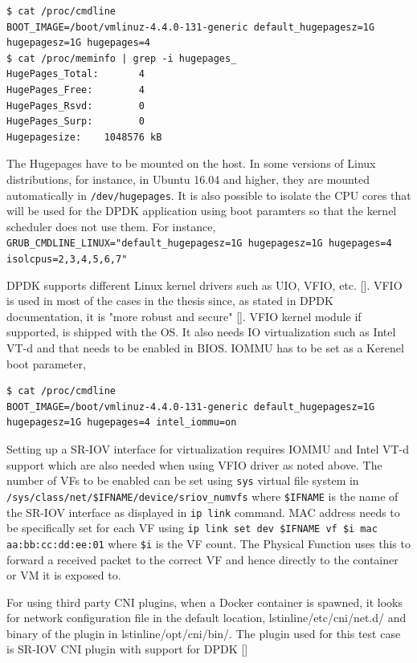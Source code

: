 \documentclass[english, 12pt, a4paper, elec, utf8, a-1b, online]{aaltothesis}
\begin{document}
\begin{lstlisting}[basicstyle={\small\ttfamily}]
$ cat /proc/cmdline 
BOOT_IMAGE=/boot/vmlinuz-4.4.0-131-generic default_hugepagesz=1G hugepagesz=1G hugepages=4
$ cat /proc/meminfo | grep -i hugepages_
HugePages_Total:       4
HugePages_Free:        4
HugePages_Rsvd:        0
HugePages_Surp:        0
Hugepagesize:    1048576 kB
\end{lstlisting}

The Hugepages have to be mounted on the host. In some versions of Linux distributions, for instance, in Ubuntu 16.04 and higher, they are mounted automatically in \lstinline{/dev/hugepages}. It is also possible to isolate the CPU cores that will be used for the DPDK application using boot paramters so that the kernel scheduler does not use them. For instance, \lstinline{GRUB_CMDLINE_LINUX="default_hugepagesz=1G hugepagesz=1G hugepages=4 isolcpus=2,3,4,5,6,7"}

DPDK supports different Linux kernel drivers such as UIO, VFIO, etc. []. VFIO is used in most of the cases in the thesis since, as stated in DPDK documentation, it is "more robust and secure" []. VFIO kernel module if supported, is shipped with the OS. It also needs IO virtualization such as Intel VT-d and that needs to be enabled in BIOS. IOMMU has to be set as a Kerenel boot parameter,
\begin{lstlisting}[basicstyle={\small\ttfamily}]
$ cat /proc/cmdline 
BOOT_IMAGE=/boot/vmlinuz-4.4.0-131-generic default_hugepagesz=1G hugepagesz=1G hugepages=4 intel_iommu=on
\end{lstlisting}

Setting up a SR-IOV interface for virtualization requires IOMMU and Intel VT-d support which are also needed when using VFIO driver as noted above. The number of VFs to be enabled can be set using \lstinline{sys} virtual file system in 
\lstinline{/sys/class/net/$IFNAME/device/sriov_numvfs} where \lstinline{$IFNAME} is the name of the SR-IOV interface as displayed in \lstinline{ip link} command. MAC address needs to be specifically set for each VF using \lstinline{ip link set dev $IFNAME vf $i mac aa:bb:cc:dd:ee:01} where \lstinline{$i} is the VF count. The Physical Function uses this to forward a received packet to the correct VF and hence directly to the container or VM it is exposed to.

For using third party CNI plugins, when a Docker container is spawned, it looks for network configuration file in the default location, lstinline{/etc/cni/net.d/} and binary of the plugin in lstinline{/opt/cni/bin/}. The plugin used for this test case is SR-IOV CNI plugin with support for DPDK []
\end{document}
